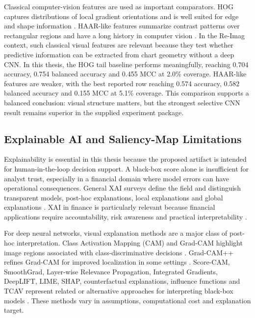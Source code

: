 Classical computer-vision features are used as important comparators. HOG captures distributions of local gradient orientations and is well suited for edge and shape information \cite{dalal_hog}. HAAR-like features summarize contrast patterns over rectangular regions and have a long history in computer vision \cite{viola_haar}. In the Re-Imag context, such classical visual features are relevant because they test whether predictive information can be extracted from chart geometry without a deep CNN. In this thesis, the HOG tail baseline performs meaningfully, reaching 0.704 accuracy, 0.754 balanced accuracy and 0.455 MCC at 2.0\% coverage. HAAR-like features are weaker, with the best reported row reaching 0.574 accuracy, 0.582 balanced accuracy and 0.155 MCC at 5.1\% coverage. This comparison supports a balanced conclusion: visual structure matters, but the strongest selective CNN result remains superior in the supplied experiment package.

\subsection{Explainable AI and Saliency-Map Limitations}
\label{subsec:xai_literature}

Explainability is essential in this thesis because the proposed artifact is intended for human-in-the-loop decision support. A black-box score alone is insufficient for analyst trust, especially in a financial domain where model errors can have operational consequences. General XAI surveys define the field and distinguish transparent models, post-hoc explanations, local explanations and global explanations \cite{guidotti_survey,adadi_berrada_xai,arrieta_xai}. XAI in finance is particularly relevant because financial applications require accountability, risk awareness and practical interpretability \cite{weber_xai_finance}.

For deep neural networks, visual explanation methods are a major class of post-hoc interpretation. Class Activation Mapping (CAM) and Grad-CAM highlight image regions associated with class-discriminative decisions \cite{zhou_cam,selvaraju_gradcam}. Grad-CAM++ refines Grad-CAM for improved localization in some settings \cite{chattopadhay_gradcampp}. Score-CAM, SmoothGrad, Layer-wise Relevance Propagation, Integrated Gradients, DeepLIFT, LIME, SHAP, counterfactual explanations, influence functions and TCAV represent related or alternative approaches for interpreting black-box models \cite{wang_scorecam,smilkov_smoothgrad,montavon_lrp,sundararajan_integrated_gradients,shrikumar_deeplift,ribeiro_lime,lundberg_shap,wachter_counterfactual,koh_influence,kim_tcav}. These methods vary in assumptions, computational cost and explanation target.

